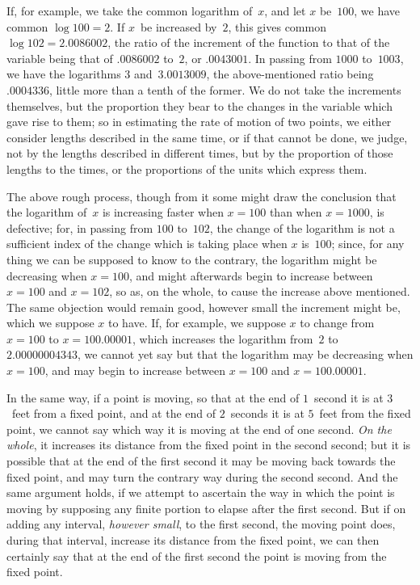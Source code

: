 \documentclass[12pt]{book}[2005/09/16]
\newcommand{\Pagelabel}[1]{\phantomsection\label{page:#1}}
\newcommand{\PageSep}[1]{\Pagelabel{#1}\ignorespaces}
\renewcommand{\(}{{\upshape(}}
\renewcommand{\)}{{\upshape)}}
\begin{document}
If, for example, we take the common logarithm of~$x$,
\PageSep{113}
and let $x$ be~$100$, we have common $\log 100 = 2$. If
$x$~be increased by~$2$, this gives common $\log 102 = 2.0086002$,
the ratio of the increment of the function
%
to that of the variable being that of $.0086002$ to~$2$, or
$.0043001$. In passing from $1000$ to~$1003$, we have the
logarithms $3$ and~$3.0013009$, the above-mentioned ratio
being~$.0004336$, little more than a tenth of the
former. We do not take the increments themselves,
but the proportion they bear to the changes in the
variable which gave rise to them; so in estimating
the rate of motion of two points, we either consider
lengths described in the same time, or if that cannot
be done, we judge, not by the lengths described in
different times, but by the proportion of those lengths
to the times, or the proportions of the units which
express them.

The above rough process, though from it some
might draw the conclusion that the logarithm of~$x$ is
increasing faster when $x = 100$ than when $x = 1000$,
is defective; for, in passing from $100$ to~$102$, the
change of the logarithm is not a sufficient index of the
change which is taking place when $x$ is~$100$; since,
for any thing we can be supposed to know to the contrary,
the logarithm might be decreasing when $x = 100$,
and might afterwards begin to increase between
$x = 100$ and $x = 102$, so as, on the whole, to cause
the increase above mentioned. The same objection
would remain good, however small the increment
might be, which we suppose $x$ to have. If, for example,
we suppose $x$ to change from $x = 100$ to $x = 100.00001$,
which increases the logarithm from~$2$ to~$2.00000004343$,
we cannot yet say but that the logarithm
may be decreasing when $x = 100$, and may begin
to increase between $x = 100$ and $x = 100.00001$.
\PageSep{114}

In the same way, if a point is moving, so that at
the end of $1$~second it is at $3$~feet from a fixed point,
and at the end of $2$~seconds it is at $5$~feet from the
fixed point, we cannot say which way it is moving at
the end of one second. \emph{On the whole}, it increases its
distance from the fixed point in the second second;
but it is possible that at the end of the first second it
may be moving back towards the fixed point, and may
turn the contrary way during the second second. And
the same argument holds, if we attempt to ascertain
the way in which the point is moving by supposing
any finite portion to elapse after the first second. But
if on adding any interval, \emph{however small}, to the first
second, the moving point does, during that interval,
increase its distance from the fixed point, we can then
certainly say that at the end of the first second the
point is moving from the fixed point.
\end{document}
